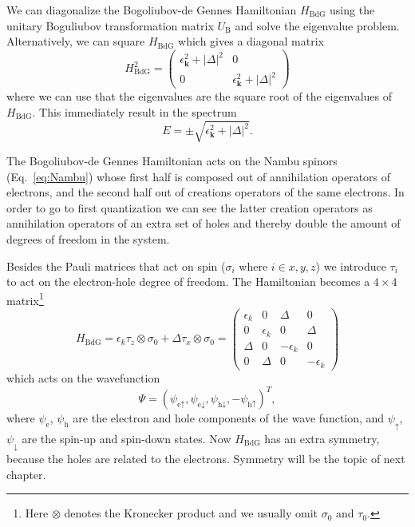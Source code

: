 We can diagonalize the Bogoliubov-de Gennes Hamiltonian $H_{\textrm{BdG}}$ using the unitary Boguliubov transformation matrix $U_{\textrm{B}}$ and solve the eigenvalue problem.
Alternatively, we can square $H_{\textrm{BdG}}$ which gives a diagonal matrix
\[
H_{\textrm{BdG}}^{2}=\left(\begin{array}{cc}
\epsilon_{\bm{k}}^{2}+\left|\Delta\right|^{2} & 0\\
0 & \epsilon_{\bm{k}}^{2}+\left|\Delta\right|^{2}
\end{array}\right)
\]
where we can use that the eigenvalues are the square root of the eigenvalues of $H_{\textrm{BdG}}$.
This immediately result in the spectrum
\begin{equation}
E=\pm\sqrt{\epsilon_{\bm{k}}^{2}+\left|\Delta\right|^{2}}.\label{eq:SC_spectrum}
\end{equation}

The Bogoliubov-de Gennes Hamiltonian acts on the Nambu spinors (Eq.~\ref{eq:Nambu}) whose first half is composed out of annihilation operators of electrons, and the second half out of creations operators of the same electrons.
In order to go to first quantization we can see the latter creation operators as annihilation operators of an extra set of holes and thereby double the amount of degrees of freedom in the system.

Besides the Pauli matrices that act on spin ($\sigma_{i}$ where $i\in x,y,z$) we introduce $\tau_{i}$ to act on the electron-hole degree of freedom.
The Hamiltonian becomes a $4\times4$ matrix\footnote{Here $\otimes$ denotes the Kronecker product and we usually omit $\sigma_{0}$ and $\tau_{0}$.}
\[
H_{\textrm{BdG}}=\epsilon_{k}\tau_{z}\otimes\sigma_{0}+\Delta\tau_{x}\otimes\sigma_{0}=\left(\begin{array}{cccc}
\epsilon_{k} & 0 & \Delta & 0\\
0 & \epsilon_{k} & 0 & \Delta\\
\Delta & 0 & -\epsilon_{k} & 0\\
0 & \Delta & 0 & -\epsilon_{k}
\end{array}\right)
\]
which acts on the wavefunction
\begin{equation}
\Psi=\left(\psi_{\textrm{e}\uparrow},\psi_{\textrm{e}\downarrow},\psi_{\textrm{h}\downarrow},-\psi_{\textrm{h}\uparrow}\right)^{T},\label{eq:4wf}
\end{equation}
where $\psi_{\textrm{e}}$, $\psi_{\textrm{h}}$ are the electron and hole components of the wave function, and $\psi_{\uparrow}$, $\psi_{\downarrow}$ are the spin-up and spin-down states.
Now $H_{\textrm{BdG}}$ has an extra symmetry, because the holes are related to the electrons.
Symmetry will be the topic of next chapter.


